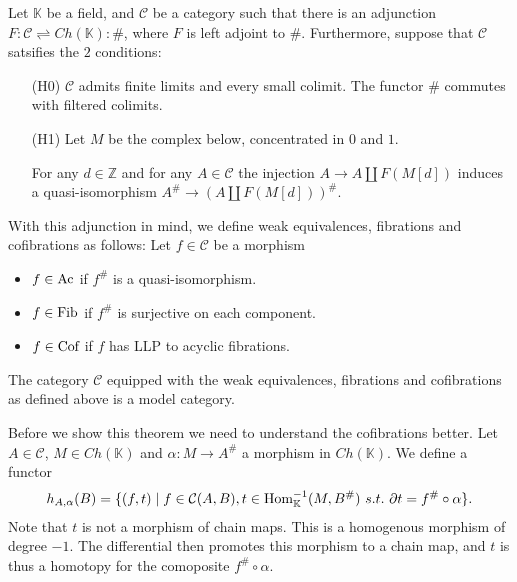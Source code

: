 \documentclass[../thesis.tex]{subfiles}
\begin{document}
            Let $\mathbb{K}$ be a field, and $\mathcal{C}$ be a category such that there is an adjunction $F:\mathcal{C}\rightleftharpoons Ch(\mathbb{K}):\#$, where $F$ is left adjoint to $\#$. Furthermore, suppose that $\mathcal{C}$ satsifies the $2$ conditions:
            \begin{itemize}
                \item[(H0)] $\mathcal{C}$ admits finite limits and every small colimit. The functor $\#$ commutes with filtered colimits.
                \item[(H1)] Let $M$ be the complex below, concentrated in $0$ and $1$.
                \begin{center}
                \end{center}
                For any $d\in \mathbb{Z}$ and for any $A\in\mathcal{C}$ the injection $A \rightarrow A \coprod F(M[d])$ induces a quasi-isomorphism $A^\# \rightarrow (A\coprod F(M[d]))^\#$.
            \end{itemize}
                
            With this adjunction in mind, we define weak equivalences, fibrations and cofibrations as follows:
            Let $f\in \mathcal{C}$ be a morphism
            \begin{itemize}
                \item $f\in \tt{Ac}$ if $f^\#$ is a quasi-isomorphism.
                \item $f\in \tt{Fib}$ if $f^\#$ is surjective on each component.
                \item $f\in \tt{Cof}$ if $f$ has LLP to acyclic fibrations.
            \end{itemize}

            \begin{thm}
                The category $\mathcal{C}$ equipped with the weak equivalences, fibrations and cofibrations as defined above is a model category.
            \end{thm}

            Before we show this theorem we need to understand the cofibrations better. Let $A\in\mathcal{C}$, $M\in Ch(\mathbb{K})$ and $\alpha : M \rightarrow A^\#$ a morphism in $Ch(\mathbb{K})$. We define a functor 
            \begin{align*}
                h_{A,\alpha}(B) = \startset{(f,t)\mid f\in \mathcal{C}(A,B), t\in \tt{Hom}^{-1}_\mathbb{K}(M, B^\#)\ s.t.\ \partial t = f^\#\circ\alpha}.
            \end{align*}
            Note that $t$ is not a morphism of chain maps. This is a homogenous morphism of degree $-1$. The differential then promotes this morphism to a chain map, and $t$ is thus a homotopy for the comoposite $f^\#\circ\alpha$.
\end{document}
